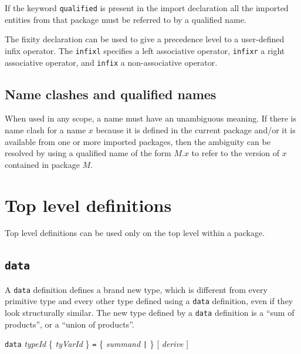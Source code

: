 \documentclass[twoside,letterpaper]{article}
\newcommand{\hm}{\hspace*{1em}}
\newcommand{\te}[1]{\texttt{#1}}
\newcommand{\nterm}[1]{\emph{#1}}
\newcommand{\term}[1]{{\tt{#1}}}
\newcommand{\many}[1]{\{ #1 \}}
\newcommand{\opt}[1]{[ #1 ]}
\newcommand{\gram}[2]{    \hm\makebox[10em][l]{\it #1}\makebox[1.5em][l]{::=}    #2}
\begin{document}
If the keyword \te{qualified} is present in the import declaration
all the imported entities from that package must be referred to
by a qualified name.

The fixity declaration can be used to give a precedence level to
a user-defined infix operator.  The \te{infixl} specifies a left
associative operator, \te{infixr} a right associative operator, and
\te{infix} a non-associative operator.


\subsection{Name clashes and qualified names}

When used in any scope, a name must have an unambiguous meaning.  If
there is name clash for a name $x$ because it is defined in the
current package and/or it is available from one or more imported
packages, then the ambiguity can be resolved by using a qualified name
of the form $M.x$ to refer to the version of $x$ contained in package
$M$.


\section{Top level definitions}

\label{sec-top-level-defs}

Top level definitions can be used only on the top level within a package.


\subsection{\te{data}}

\label{sec-data}

A {\te{data}} definition defines a brand new type, which is different
from every primitive type and every other type defined using a
{\te{data}} definition, even if they look structurally similar.  The
new type defined by a {\te{data}} definition is a ``sum of products'',
or a ``union of products''.

\gram{topDefn}{ \term{data} \nterm{typeId} \many{\nterm{tyVarId}} \term{=} \many{\nterm{summand} \term{|}} \opt{\nterm{derive}}}
\end{document}
